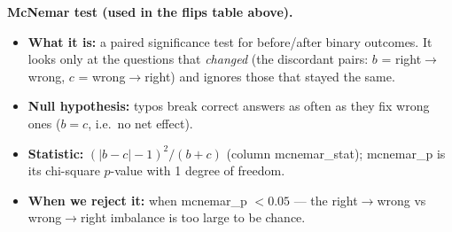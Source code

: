 \documentclass[11pt]{article}
\begin{document}
\medskip
\noindent\textbf{McNemar test (used in the flips table above).}
\begin{itemize}\setlength{\itemsep}{1pt}
  \item \textbf{What it is:} a paired significance test for before/after binary
  outcomes. It looks only at the questions that \emph{changed} (the discordant pairs:
  $b$ = right$\to$wrong, $c$ = wrong$\to$right) and ignores those that stayed the same.
  \item \textbf{Null hypothesis:} typos break correct answers as often as they fix
  wrong ones ($b = c$, i.e.\ no net effect).
  \item \textbf{Statistic:} $(|b - c| - 1)^2 / (b + c)$ (column mcnemar\_stat);
  mcnemar\_p is its chi-square $p$-value with 1 degree of freedom.
  \item \textbf{When we reject it:} when mcnemar\_p $< 0.05$ --- the
  right$\to$wrong vs wrong$\to$right imbalance is too large to be chance.
\end{itemize}
\end{document}
